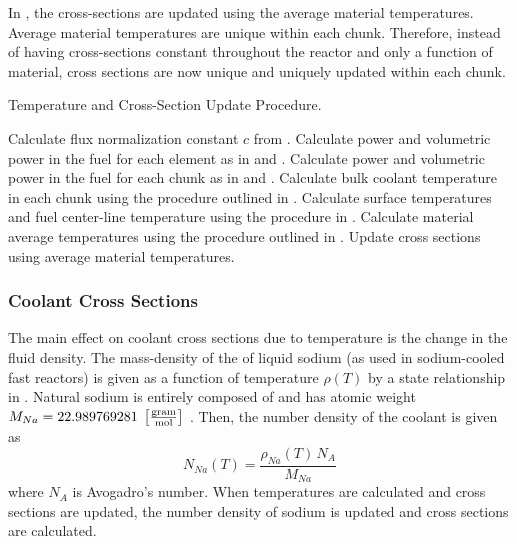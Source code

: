     In , the cross-sections are
    updated using the average material temperatures. Average material
    temperatures are unique within each chunk. Therefore, instead of having
    cross-sections constant throughout the reactor and only a function of
    material, cross sections are now unique and uniquely updated within each
    chunk.

    \begin{algorithm}
      \caption{Temperature and Cross-Section Update Procedure.}
      \label{algorithm:temperature_update}
      \begin{algorithmic}[1]
        \State Calculate flux normalization constant $c$ from
          .
        \State Calculate power and volumetric power in the fuel for each element
          as in  and .
        \State Calculate power and volumetric power in the fuel for each chunk
          as in  and .
        \State Calculate bulk coolant temperature in each chunk using the 
          procedure outlined in .
        \State Calculate surface temperatures and fuel center-line temperature
          using the procedure in .
        \State Calculate material average temperatures using the procedure 
          outlined in .
        \State Update cross sections using average material temperatures.
      \end{algorithmic}
    \end{algorithm}

    \subsubsection{Coolant Cross Sections}
      The main effect on coolant cross sections due to temperature is the change
      in the fluid density. The mass-density of the of liquid sodium (as used in
      sodium-cooled fast reactors) is given as a function of temperature
      $\rho(T)$ by a state relationship in \cite{sodiumProp}. Natural sodium is
      entirely composed of  and has atomic weight $M_{Na} =
      22.989769281 \;\left[\text{{$\frac{\text{gram}}{\text{mol}}$}}\right]$ \cite{nuclides}.
      Then, the number density of the coolant is given as
      \begin{equation}
        \label{eq:number_density_sodium}
        N_{Na}(T) = \frac{\rho_{Na}(T) \, N_A}{M_{Na}}
      \end{equation}
      where $N_A$ is Avogadro's number. When temperatures are calculated and
      cross sections are updated, the number density of sodium is updated and
      cross sections are calculated. 
      

